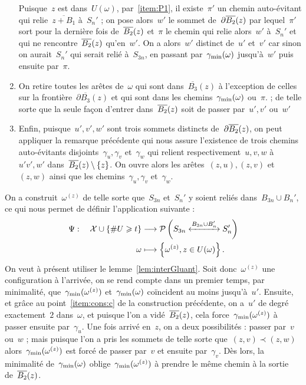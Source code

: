 \begin{dem}
\begin{enumerate}
					Puisque~$z$ est dans~$U(\omega)$, par~\ref{item:P1}, il existe~$\pi'$ un chemin auto-évitant qui relie~$\overline{z+B_1}$ à~$S_n'$ ; on pose alors~$w'$  le sommet de~$\partial\BRz$ par lequel~$\pi'$ sort pour la dernière fois de~$\BRz$ et~$\pi$\marginnote{$\pi$} le chemin qui relie alors~$w'$ à~$S_n'$ et qui ne rencontre~$\BRz$ qu'en~$w'$. On a alors~$w'$ distinct de~$u'$ et~$v'$ car sinon on aurait~$S_n'$ qui serait relié à~$S_{3n}$, en passant par~$\Cmin$ jusqu'à~$w'$ puis ensuite par~$\pi$.
					\item\label{item:cons:c} On retire toutes les arêtes de~$\omega$ qui sont dans~$\overline{B_3}(z)$ à l'exception de celles sur la frontière~$\partial\overline{B_3}(z)$ et qui sont dans les chemins~$\Cmin$ ou~$\pi$. ; de telle sorte que la seule façon d'entrer dans~$\BRz$ soit de passer par~$u', v'$ ou~$w'$
					\item\label{item:cons:d} Enfin, puisque~$u',v',w'$ sont trois sommets distincts de~$\partial\BRz$, on peut appliquer la remarque précédente qui nous assure l'existence de trois chemins auto-évitants disjoints~$\gamma_u,\gamma_v$ et~$\gamma_w$  qui relient respectivement~$u,v,w$ à~$u'v',w'$ dans~$\BRz\priv\{z\}$.  On ouvre alors les arêtes~$(z,u), (z,v)$ et~$(z,w)$ ainsi que les chemins~$\gamma_u,\gamma_v$ et~$\gamma_w$. 
				\end{enumerate}
				On a construit~$\omega^{(z)}$ de telle sorte que~$S_{3n}$ et~$S_n'$ y soient reliés dans~$B_{3n}\cup B_n'$, ce qui nous permet de définir l'application suivante :
				\begin{align*}
					\Psi : \quad \mathcal{X} \cup \{\# U \geq t\} 	& \longrightarrow 
							\mathcal{P}\left(
								\relie[B_{3n}\cup B_n']{S_{3n}}{S_n'}		
							\right)\\
								\omega	& \longmapsto  \left\{\omega^{(z)}, z\in U(\omega)\right\}.
				\end{align*}
				On veut à présent utiliser le lemme~\ref{lem:interGluant}. Soit donc~$\omega^{(z)}$ une configuration à l'arrivée, on se rend compte dans un premier temps, par minimalité, que~$\Cmin[\omega^{(z)}]$ et~$\Cmin$ coïncident au moins jusqu'à~$u'$. Ensuite, et grâce au point~\ref{item:cons:c} de la construction précédente, on a~$u'$ de degré exactement~$2$ dans~$\omega$, et puisque l'on a vidé~$\BRz$, cela force~$\Cmin[\omega^{(z)}]$ à passer ensuite par~$\gamma_u$. Une fois arrivé en~$z$, on a deux possibilités : passer par~$v$ ou~$w$ ; mais puisque l'on a pris les sommets de telle sorte que~$(z,v)\prec (z,w)$ alors~$\Cmin[\omega^{(z)}]$ est forcé de passer par~$v$ et ensuite par~$\gamma_v$. Dès lors, la minimalité de~$\Cmin$ oblige~$\Cmin[\omega^{(z)}]$ à prendre le même chemin à la sortie de~$\BRz$.
				

\end{dem}
